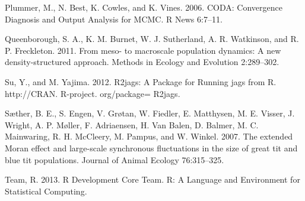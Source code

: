 \documentclass[12pt,]{article}
\begin{document}
Plummer, M., N. Best, K. Cowles, and K. Vines. 2006. CODA: Convergence
Diagnosis and Output Analysis for MCMC. R News 6:7--11.

Queenborough, S. A., K. M. Burnet, W. J. Sutherland, A. R. Watkinson,
and R. P. Freckleton. 2011. From meso- to macroscale population
dynamics: A new density-structured approach. Methods in Ecology and
Evolution 2:289--302.

Su, Y., and M. Yajima. 2012. R2jags: A Package for Running jags from R.
http://CRAN. R-project. org/package= R2jags.

Sæther, B. E., S. Engen, V. Grøtan, W. Fiedler, E. Matthysen, M. E.
Visser, J. Wright, A. P. Møller, F. Adriaensen, H. {Van Balen}, D.
Balmer, M. C. Mainwaring, R. H. McCleery, M. Pampus, and W. Winkel.
2007. The extended Moran effect and large-scale synchronous fluctuations
in the size of great tit and blue tit populations. Journal of Animal
Ecology 76:315--325.

Team, R. 2013. R Development Core Team. R: A Language and Environment
for Statistical Computing.
\end{document}
